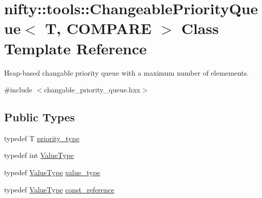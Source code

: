 \hypertarget{classnifty_1_1tools_1_1ChangeablePriorityQueue}{}\section{nifty\+:\+:tools\+:\+:Changeable\+Priority\+Queue$<$ T, C\+O\+M\+P\+A\+RE $>$ Class Template Reference}
\label{classnifty_1_1tools_1_1ChangeablePriorityQueue}


Heap-\/based changable priority queue with a maximum number of elemements.  




{\ttfamily \#include $<$changable\+\_\+priority\+\_\+queue.\+hxx$>$}

\subsection*{Public Types}
\begin{DoxyCompactItemize}
\item 
typedef T \hyperlink{classnifty_1_1tools_1_1ChangeablePriorityQueue_a6ecafb387f99a1cfa7ff5795c924682c}{priority\+\_\+type}
\item 
typedef int \hyperlink{classnifty_1_1tools_1_1ChangeablePriorityQueue_a3b9e96ad70a62b02b4a117d58f758a1f}{Value\+Type}
\item 
typedef \hyperlink{classnifty_1_1tools_1_1ChangeablePriorityQueue_a3b9e96ad70a62b02b4a117d58f758a1f}{Value\+Type} \hyperlink{classnifty_1_1tools_1_1ChangeablePriorityQueue_aa00fbc748b94bdc6175b4c49bb2bba48}{value\+\_\+type}
\item 
typedef \hyperlink{classnifty_1_1tools_1_1ChangeablePriorityQueue_a3b9e96ad70a62b02b4a117d58f758a1f}{Value\+Type} \hyperlink{classnifty_1_1tools_1_1ChangeablePriorityQueue_acb7eb23bd9ca7c52955adc06bf4816c3}{const\+\_\+reference}
\end{DoxyCompactItemize}
